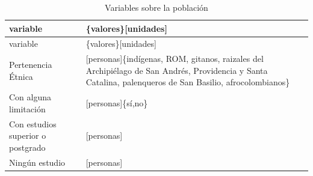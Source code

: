\documentclass[12pt,a4paper,oneside, openany]{book}
\theoremstyle{definition}
\theoremstyle{definition}
\theoremstyle{definition}
\theoremstyle{remark}
\begin{document}
\begin{longtable}[]{@{}ll@{}}
\caption{\label{tab:vars-poblacion} Variables sobre la
población}\tabularnewline
\toprule
\begin{minipage}[b]{0.20\columnwidth}\raggedright\strut
variable\strut
\end{minipage} & \begin{minipage}[b]{0.43\columnwidth}\raggedright\strut
\{valores\}{[}unidades{]}\strut
\end{minipage}\tabularnewline
\midrule
\endfirsthead
\toprule
\begin{minipage}[b]{0.20\columnwidth}\raggedright\strut
variable\strut
\end{minipage} & \begin{minipage}[b]{0.43\columnwidth}\raggedright\strut
\{valores\}{[}unidades{]}\strut
\end{minipage}\tabularnewline
\midrule
\endhead
\begin{minipage}[t]{0.20\columnwidth}\raggedright\strut
Pertenencia Étnica\strut
\end{minipage} & \begin{minipage}[t]{0.43\columnwidth}\raggedright\strut
{[}personas{]}\{indígenas, ROM, gitanos, raizales del Archipiélago de
San Andrés, Providencia y Santa Catalina, palenqueros de San Basilio,
afrocolombianos\}\strut
\end{minipage}\tabularnewline
\begin{minipage}[t]{0.20\columnwidth}\raggedright\strut
Con alguna limitación\strut
\end{minipage} & \begin{minipage}[t]{0.43\columnwidth}\raggedright\strut
{[}personas{]}\{sí,no\}\strut
\end{minipage}\tabularnewline
\begin{minipage}[t]{0.20\columnwidth}\raggedright\strut
Con estudios superior o postgrado\strut
\end{minipage} & \begin{minipage}[t]{0.43\columnwidth}\raggedright\strut
{[}personas{]}\strut
\end{minipage}\tabularnewline
\begin{minipage}[t]{0.20\columnwidth}\raggedright\strut
Ningún estudio\strut
\end{minipage} & \begin{minipage}[t]{0.43\columnwidth}\raggedright\strut
{[}personas{]}\strut
\end{minipage}\tabularnewline
\bottomrule
\end{longtable}
\end{document}

